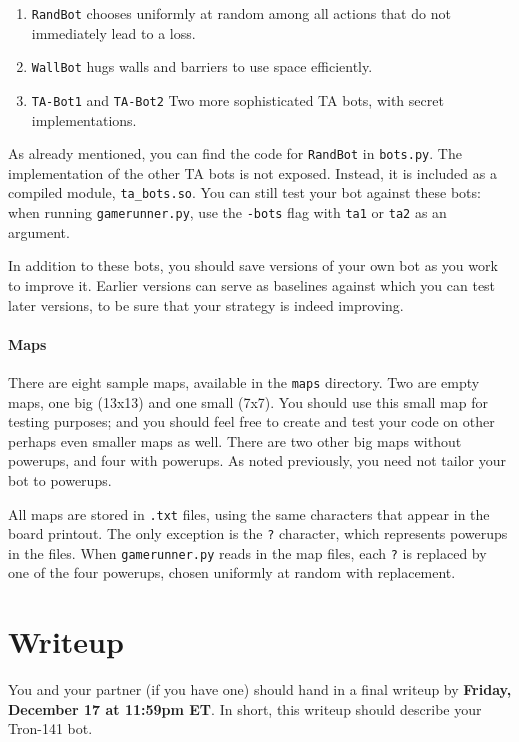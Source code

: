 \documentclass{article}
\newcommand{\amy}[1]{{\color{blue}[Amy: #1]}}
\begin{document}
\begin{enumerate}
\item \texttt{RandBot} chooses uniformly at random among all actions that do not immediately lead to a loss.

\item \texttt{WallBot} hugs walls and barriers to use space efficiently.

\item \texttt{TA-Bot1} and \texttt{TA-Bot2} Two more sophisticated TA bots, with secret implementations.
\end{enumerate}

As already mentioned, you can find the code for \texttt{RandBot} in \verb|bots.py|.  The implementation of the other
TA bots is not exposed.  Instead, it is included as a compiled module,
\verb|ta_bots.so|.  You can still test your bot against these bots:
when running \texttt{gamerunner.py}, use the \texttt{-bots} flag with
\texttt{ta1} or \texttt{ta2} as an argument.

In addition to these bots, you should save versions of your own bot as
you work to improve it.  Earlier versions can serve as baselines
against which you can test later versions, to be sure that your
strategy is indeed improving.



\paragraph{Maps}
There are eight sample maps, available in the \texttt{maps} directory.
Two are empty maps, one big (13x13) and one small (7x7).  You should
use this small map for testing purposes; and you should feel free to
create and test your code on other perhaps even smaller maps as well.
There are two other big maps without powerups, and four with powerups.
As noted previously, you need not tailor your bot to powerups.

All maps are stored in \texttt{.txt} files, using the same characters
that appear in the board printout.  The only exception is the
\texttt{?} character, which represents powerups in the files.  When
\texttt{gamerunner.py} reads in the map files, each \texttt{?} is
replaced by one of the four powerups, chosen uniformly at random
with replacement.


\section{Writeup}
You and your partner (if you have one) should hand in a final writeup
by \textbf{Friday, December 17 at 11:59pm ET}.  In short, this writeup
should describe your Tron-141 bot.
\end{document}

